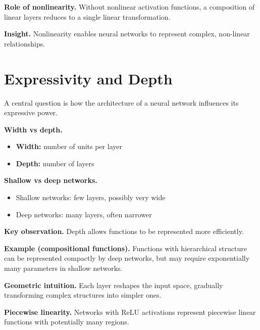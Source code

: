 \medskip

\noindent
\textbf{Role of nonlinearity.}  
Without nonlinear activation functions, a composition of linear layers reduces to a single linear transformation.

\medskip

\noindent
\textbf{Insight.}  
Nonlinearity enables neural networks to represent complex, non-linear relationships.

\section{Expressivity and Depth}

A central question is how the architecture of a neural network influences its expressive power.

\medskip

\noindent
\textbf{Width vs depth.}
\begin{itemize}
    \item \textbf{Width:} number of units per layer
    \item \textbf{Depth:} number of layers
\end{itemize}

\medskip

\noindent
\textbf{Shallow vs deep networks.}
\begin{itemize}
    \item Shallow networks: few layers, possibly very wide
    \item Deep networks: many layers, often narrower
\end{itemize}

\medskip

\noindent
\textbf{Key observation.}  
Depth allows functions to be represented more efficiently.

\medskip

\noindent
\textbf{Example (compositional functions).}  
Functions with hierarchical structure can be represented compactly by deep networks, but may require exponentially many parameters in shallow networks.

\medskip

\noindent
\textbf{Geometric intuition.}  
Each layer reshapes the input space, gradually transforming complex structures into simpler ones.

\medskip

\noindent
\textbf{Piecewise linearity.}  
Networks with ReLU activations represent piecewise linear functions with potentially many regions.

